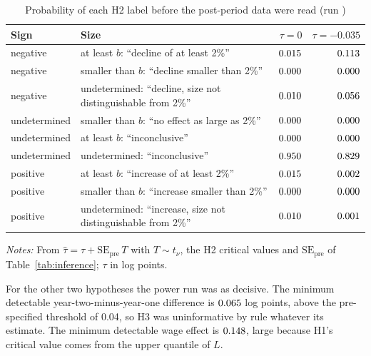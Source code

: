 \begin{table}[tbp]
\centering
\caption{Probability of each H2 label before the post-period data were read (run )}
\label{tab:labelprob}
\small
\begin{tabularx}{\linewidth}{@{}l>{\raggedright\arraybackslash}Xrr@{}}
\toprule
Sign & Size & $\tau = 0$ & $\tau = -0.035$ \\
\midrule
negative & at least $b$: ``decline of at least 2\%'' & $0.015$ & $0.113$ \\
negative & smaller than $b$: ``decline smaller than 2\%'' & $0.000$ & $0.000$ \\
negative & undetermined: ``decline, size not distinguishable from 2\%'' & $0.010$ & $0.056$ \\
undetermined & smaller than $b$: ``no effect as large as 2\%'' & $0.000$ & $0.000$ \\
undetermined & at least $b$: ``inconclusive'' & $0.000$ & $0.000$ \\
undetermined & undetermined: ``inconclusive'' & $0.950$ & $0.829$ \\
positive & at least $b$: ``increase of at least 2\%'' & $0.015$ & $0.002$ \\
positive & smaller than $b$: ``increase smaller than 2\%'' & $0.000$ & $0.000$ \\
positive & undetermined: ``increase, size not distinguishable from 2\%'' & $0.010$ & $0.001$ \\
\bottomrule
\end{tabularx}

\medskip
\begin{minipage}{\linewidth}\footnotesize
\emph{Notes:} From $\hat\tau = \tau + \mathrm{SE}_{\mathrm{pre}}\,T$ with $T \sim t_\nu$, the H2
critical values and $\mathrm{SE}_{\mathrm{pre}}$ of Table~\ref{tab:inference}; $\tau$ in log
points.
\end{minipage}
\end{table}

For the other two hypotheses the power run was as decisive. The minimum detectable
year-two-minus-year-one difference is $0.065$ log points, above the pre-specified threshold
of 0.04, so H3 was uninformative by rule whatever its estimate. The minimum detectable wage effect
is $0.148$, large because H1's critical value comes from the upper quantile of $L$.


